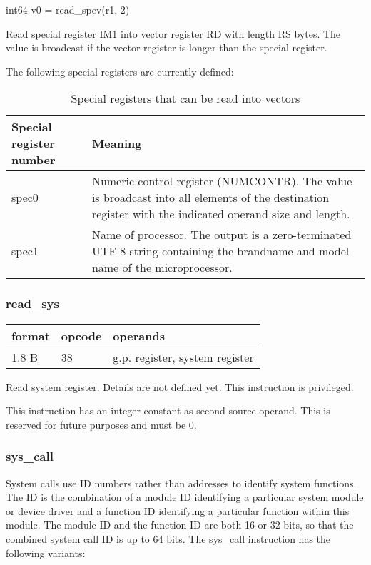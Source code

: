 \documentclass[forwardcom.tex]{subfiles}
\begin{document}
int64 v0 = read\_spev(r1, 2)
\vspace{2mm}

Read special register IM1 into vector register RD with length RS bytes. The value is broadcast if the vector register is longer than the special register. 
\vspace{2mm}

The following special registers are currently defined:

\begin{longtable} {|p{15mm}|p{100mm}|}
\caption{Special registers that can be read into vectors} 
\label{table:specialVectorRegisters} \\
\endfirsthead
\endhead
\hline
\bfseries Special register number & \bfseries Meaning  \\
\hline
spec0 & Numeric control register (NUMCONTR). The value is broadcast into all elements of the destination register with the indicated operand size and length.  \\
\hline
spec1 & Name of processor. The output is a zero-terminated UTF-8 string containing the brandname and model name of the microprocessor. \\
\hline
\end{longtable}


\subsubsection{read\_sys}
\label{table:readSysInstruction}
\begin{tabular}{|p{12mm}|p{12mm}|p{110mm}|}
\hline
\bfseries format & \bfseries opcode & \bfseries operands \\ \hline
1.8 B & 38 & g.p. register, system register \\ \hline
\end{tabular}
\vspace{2mm}

Read system register. Details are not defined yet. This instruction is privileged.

\vspace{2mm}

This instruction has an integer constant as second source operand. This is reserved for future purposes and must be 0.

\subsubsection{sys\_call}
\label{systemCallInstruction}
System calls use ID numbers rather than addresses to identify system functions. 
The ID is the combination of a module ID identifying a particular system module or device driver and a function ID identifying a particular function within this module. The module ID and the function ID are both 16 or 32 bits, so that the combined system call ID is up to 64 bits.
The sys\_call instruction has the following variants:
\end{document}
